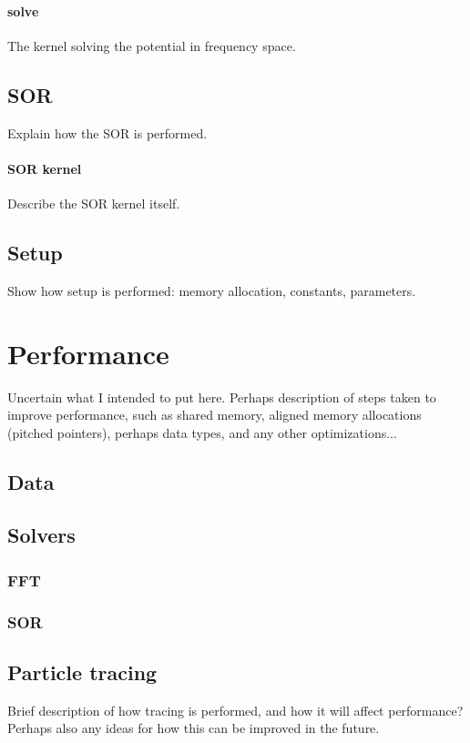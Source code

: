 \paragraph{solve}
The kernel solving the potential in frequency space.

\subsection{SOR}
Explain how the SOR is performed.
\paragraph{SOR kernel}
Describe the SOR kernel itself.

\subsection{Setup}
Show how setup is performed: memory allocation, constants, parameters.


\section{Performance}
Uncertain what I intended to put here. Perhaps description of steps taken to
improve performance, such as shared memory, aligned memory allocations 
(pitched pointers), perhaps data types, and any other optimizations...
\subsection{Data}
\subsection{Solvers}
\subsubsection{FFT}
\subsubsection{SOR}

\subsection{Particle tracing}
Brief description of how tracing is performed, and how it will affect
performance? Perhaps also any ideas for how this can be improved in the future.
